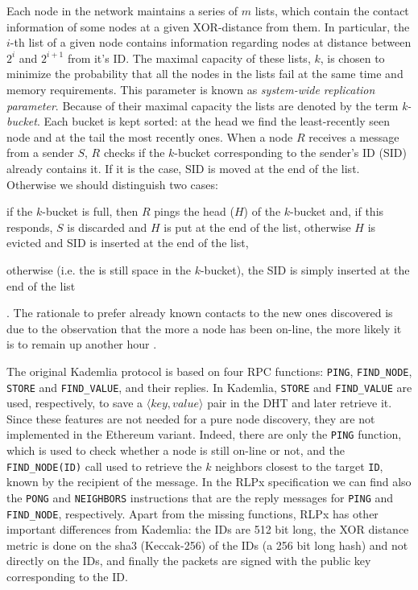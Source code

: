 Each node in the network maintains a series of $m$
lists, which contain the contact information of some nodes at a given
XOR-distance from them.
In particular, the $i$-th list of a given node contains
information regarding nodes at distance between $2^i$ and $2^{i+1}$ from 
it's ID.
The maximal capacity of these lists, $k$, is chosen to minimize the
probability that all the nodes in the lists fail at the same 
time and memory requirements.
This parameter is  known as \emph{system-wide replication parameter}.
Because of their maximal capacity the lists are denoted by the term
\emph{k-bucket}.
Each bucket is kept sorted: at the head we find the least-recently seen node
and at the tail the most recently ones.
When a node $R$ receives a message from a sender $S$, $R$
checks if the $k$-bucket corresponding to the sender's ID (SID) already contains
it. If it is the case, SID is moved at the end of the list. Otherwise we should
distinguish two cases:
\begin{enumerate*}[label=(\arabic*)]
  \item if the $k$-bucket is full, then $R$ pings the head ($H$) of the
  $k$-bucket and, if this responds, $S$ is discarded and $H$ is put at the end
  of the list, otherwise $H$ is evicted and SID is inserted at the end of the
  list,
  \item otherwise (i.e. the is still space in the $k$-bucket), the SID is simply
  inserted at the end of the list
\end{enumerate*}.
The rationale to prefer already known contacts to the new ones discovered is due
to the observation that the more a node has been on-line, the more likely it is
to remain up another hour \cite{bib:kademlia}.

The original Kademlia protocol is based on four RPC functions: \verb|PING|,
\verb|FIND_NODE|, \verb|STORE| and \verb|FIND_VALUE|, and their replies. In
Kademlia, \verb|STORE| and \verb|FIND_VALUE| are used, respectively, to save a
$\langle key, value\rangle$ pair in the DHT and later retrieve it. Since these
features are not needed for a pure node discovery, they are not implemented in
the Ethereum variant. Indeed, there are only the \verb|PING| function, which is
used to check whether a node is still on-line or not, and the
\verb|FIND_NODE(ID)| call used to retrieve the $k$ neighbors closest to the
target \verb|ID|, known by the recipient of the message. In the RLPx
specification we can find also the \verb|PONG| and \verb|NEIGHBORS| instructions
that are the reply messages for \verb|PING| and \verb|FIND_NODE|, respectively.
Apart from the missing functions, RLPx has other important differences from
Kademlia: the IDs are 512 bit long, the XOR distance metric is done on the
sha3 (Keccak-256) of the IDs (a 256 bit long hash) and not directly on the
IDs, and finally the packets are signed with the public key corresponding to the
ID.

